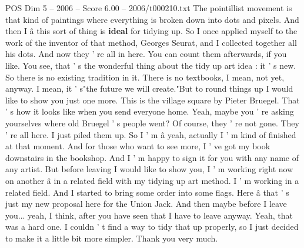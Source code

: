\begin{textsample}{POS Dim 5 – 2006 – Score 6.00 – 2006/t000210.txt}
The pointillist movement is that kind of paintings where everything is broken down into dots and pixels.
And then I â this sort of thing is \textbf{ideal} for tidying up.
So I once applied myself to the work of the inventor of that method, Georges Seurat, and I collected together all his dots.
And now they ' re all in here.
You can count them afterwards, if you like.
You see, that ' s the wonderful thing about the tidy up art idea : it ' s new.
So there is no existing tradition in it.
There is no textbooks, I mean, not yet, anyway.
I mean, it ' s"the future we will create."But to round things up I would like to show you just one more.
This is the village square by Pieter Bruegel.
That ' s how it looks like when you send everyone home.
Yeah, maybe you ' re asking yourselves where old Bruegel ' s people went?
Of course, they ' re not gone.
They ' re all here.
I just piled them up.
So I ' m â yeah, actually I ' m kind of finished at that moment.
And for those who want to see more, I ' ve got my book downstairs in the bookshop.
And I ' m happy to sign it for you with any name of any artist.
But before leaving I would like to show you, I ' m working right now on another â in a related field with my tidying up art method.
I ' m working in a related field.
And I started to bring some order into some flags.
Here â that ' s just my new proposal here for the Union Jack.
And then maybe before I leave you... yeah, I think, after you have seen that I have to leave anyway.
Yeah, that was a hard one.
I couldn ' t find a way to tidy that up properly, so I just decided to make it a little bit more simpler.
Thank you very much.

\end{textsample}
